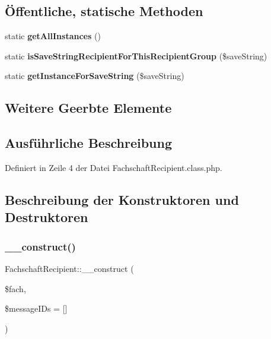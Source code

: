 \subsection*{Öffentliche, statische Methoden}
\begin{DoxyCompactItemize}
\item 
\mbox{\label{class_fachschaft_recipient_ab0a88bcc68f9938f4c6551bac26139dc}} 
static {\bfseries get\+All\+Instances} ()
\item 
\mbox{\label{class_fachschaft_recipient_a2b5964f12d2ce246be6fba92468f9d21}} 
static {\bfseries is\+Save\+String\+Recipient\+For\+This\+Recipient\+Group} (\$save\+String)
\item 
\mbox{\label{class_fachschaft_recipient_af55c5cf5d583349cbcb18036e3399499}} 
static {\bfseries get\+Instance\+For\+Save\+String} (\$save\+String)
\end{DoxyCompactItemize}
\subsection*{Weitere Geerbte Elemente}


\subsection{Ausführliche Beschreibung}


Definiert in Zeile 4 der Datei Fachschaft\+Recipient.\+class.\+php.



\subsection{Beschreibung der Konstruktoren und Destruktoren}
\mbox{\label{class_fachschaft_recipient_a0c85915239e1f2f9b0fcc21a1087eed2}} 
\subsubsection{\texorpdfstring{\+\_\+\+\_\+construct()}{\_\_construct()}}
{\footnotesize\ttfamily Fachschaft\+Recipient\+::\+\_\+\+\_\+construct (\begin{DoxyParamCaption}\item[{}]{\$fach,  }\item[{}]{\$message\+I\+Ds = {\ttfamily \mbox{[}\mbox{]}} }\end{DoxyParamCaption})}

